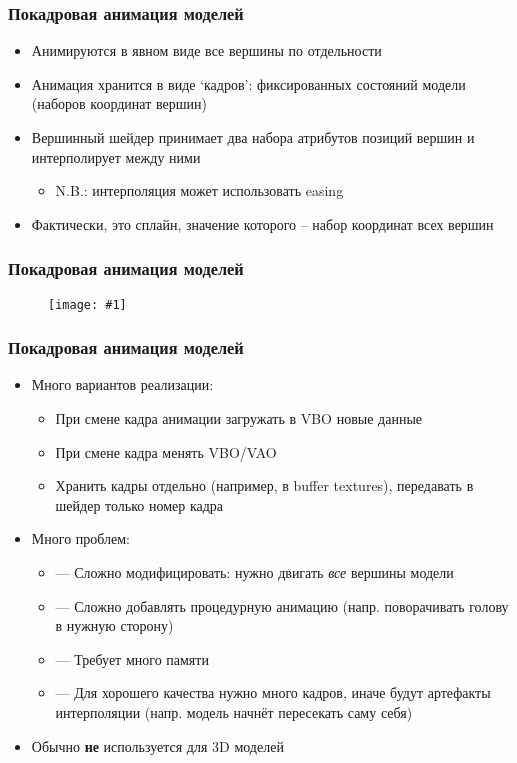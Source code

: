 \documentclass{beamer}
\newcommand{\slideimage}[1]{
  \begin{figure}
    \begin{adjustbox}{width=\textwidth, totalheight=\textheight-2\baselineskip-2\baselineskip,keepaspectratio}
      \texttt{[image: \#1]}
    \end{adjustbox}
  \end{figure}
}
\begin{document}
\begin{frame}[fragile]
\frametitle{Покадровая анимация моделей}
\begin{itemize}
\item Анимируются в явном виде все вершины по отдельности
\pause
\item Анимация хранится в виде `кадров': фиксированных состояний модели (наборов координат вершин)
\pause
\item Вершинный шейдер принимает два набора атрибутов позиций вершин и интерполирует между ними
\begin{itemize}
\item N.B.: интерполяция может использовать easing
\end{itemize}
\pause
\item Фактически, это сплайн, значение которого -- набор координат всех вершин
\end{itemize}
\end{frame}

\begin{frame}[fragile]
\frametitle{Покадровая анимация моделей}
\slideimage{keyframes.jpg}
\end{frame}

\begin{frame}[fragile]
\frametitle{Покадровая анимация моделей}
\begin{itemize}
\item Много вариантов реализации:
\begin{itemize}
\item При смене кадра анимации загружать в VBO новые данные
\item При смене кадра менять VBO/VAO
\item Хранить кадры отдельно (например, в buffer textures), передавать в шейдер только номер кадра
\end{itemize}
\pause
\item Много проблем:
\pause
\begin{itemize}
\item {\color{red}---} Сложно модифицировать: нужно двигать \textit{все} вершины модели
\pause
\item {\color{red}---} Сложно добавлять процедурную анимацию (напр. поворачивать голову в нужную сторону)
\pause
\item {\color{red}---} Требует много памяти
\pause
\item {\color{red}---} Для хорошего качества нужно много кадров, иначе будут артефакты интерполяции (напр. модель начнёт пересекать саму себя)
\end{itemize}
\pause
\item Обычно \textbf{не} используется для 3D моделей
\end{itemize}
\end{frame}
\end{document}
